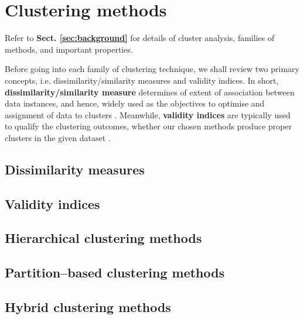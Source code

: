\section{Clustering methods}
\label{sec:clustering_methods}

Refer to \textbf{Sect. \ref{sec:background}} for details of cluster analysis, families of methods, and important properties.

Before going into each family of clustering technique, we shall review two primary concepts, i.e. dissimilarity/similarity measures and validity indices.
In short, \textbf{dissimilarity/similarity measure} determines of extent of association between data instances, and hence, widely used as the objectives to optimise and assignment of data to clusters \cite{ref_1}.
Meanwhile, \textbf{validity indices} are typically used to qualify the clustering outcomes, whether our chosen methods produce proper clusters in the given dataset \cite{ref_1}.

\subsection{Dissimilarity measures}

\newpage
\subsection{Validity indices}
% 



\newpage
\subsection{Hierarchical clustering methods}



\newpage
\subsection{Partition–based clustering methods}


\newpage
\subsection{Hybrid clustering methods}
